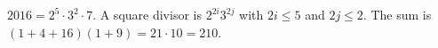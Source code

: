 $2016=2^5\cdot3^2\cdot7$. A square divisor is $2^{2i}3^{2j}$ with $2i\le5$ and $2j\le2$. The sum is $(1+4+16)(1+9)=21\cdot10=\boxed{210}$.
